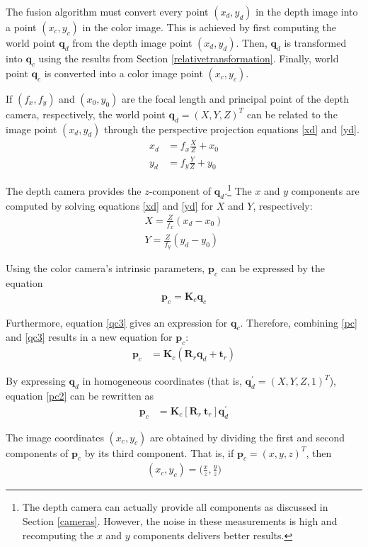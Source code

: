 The fusion algorithm must convert every point $(x_d, y_d)$ in the depth image into a point $(x_c, y_c)$ in 
the color image. This is achieved by first computing the world point $\mathbf{q}_d$ from the depth image
point $(x_d, y_d)$. Then, $\mathbf{q}_d$ is transformed into $\mathbf{q}_c$ using the results from Section 
\ref{relativetransformation}. Finally, world point $\mathbf{q}_c$ is converted into a color image point 
$(x_c, y_c)$.

If $(f_x, f_y)$ and $(x_0, y_0)$ are the focal length and principal point of the depth camera, respectively, 
the world point $\mathbf{q}_d = (X, Y, Z)^T$ can be related to the image point $(x_d, y_d)$ through the 
perspective projection equations \eqref{xd} and \eqref{yd}. 
\begin{align}
	x_d &= f_x \frac{X}{Z} + x_0 \label{xd} \\
	y_d &= f_y \frac{Y}{Z} + y_0 \label{yd} 
\end{align}
	
The depth camera provides the $z$-component of $\mathbf{q}_d$.\footnote{The depth camera can actually 
provide all components as discussed in Section \ref{cameras}. However, the noise in these measurements is 
high and recomputing the $x$ and $y$ components delivers better results.}
The $x$ and $y$ components are computed by solving equations \eqref{xd} and \eqref{yd} for $X$ and 
$Y$, respectively:
\begin{align}
	X = \frac{Z}{f_x} (x_d - x_0) \label{X} \\
	Y = \frac{Z}{f_y} (y_d - y_0) \label{Y}
\end{align}

Using the color camera's intrinsic parameters, $\mathbf{p}_c$ can be expressed by the equation
\begin{align}
	\mathbf{p}_c = \mathbf{K}_c \mathbf{q}_c \label{pc}
\end{align}

Furthermore, equation \eqref{qc3} gives an expression for $\mathbf{q}_c$. Therefore, combining 
\eqref{pc} and \eqref{qc3} results in a new equation for $\mathbf{p}_c$:
\begin{align}
	\mathbf{p}_c &=  \mathbf{K}_c (\mathbf{R}_r \mathbf{q}_{d}  + \mathbf{t}_r) \label{pc2}
\end{align}

By expressing $\mathbf{q}_{d}$ in homogeneous coordinates (that is, $\mathbf{q}_{d}^{'} = (X, Y, Z, 1)^T$), 
equation \eqref{pc2} can be rewritten as 
\begin{align}
	\mathbf{p}_c &=  \mathbf{K}_c [\mathbf{R}_r  ~  \mathbf{t}_r] \mathbf{q}_{d}^{'} \label{pc3}
\end{align}

The image coordinates $(x_c, y_c)$ are obtained by dividing the first and second components of 
$\mathbf{p}_c$ by its third component. That is, if $\mathbf{p}_c = (x,y,z)^T$, then 
\begin{align}
	(x_c, y_c) = \Bigg( \frac{x}{z} , \frac{y}{z} \Bigg) \label{xcyc}
\end{align}